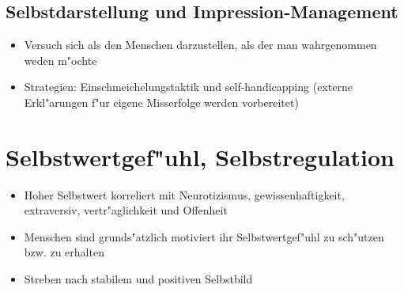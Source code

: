 \subsection{Selbstdarstellung und Impression-Management}
\begin{itemize}
	\item
		Versuch sich als den Menschen darzustellen, als der man wahrgenommen weden m"ochte
	\item
		Strategien: Einschmeichelungstaktik und self-handicapping (externe Erkl"arungen f"ur eigene Misserfolge werden vorbereitet)
\end{itemize}

\section{Selbstwertgef"uhl, Selbstregulation}
\begin{itemize}
	\item
		Hoher Selbstwert korreliert mit Neurotizismus, gewissenhaftigkeit, extraversiv, vertr"aglichkeit und Offenheit
	\item
		Menschen sind grunds"atzlich motiviert ihr Selbstwertgef"uhl zu sch"utzen bzw. zu erhalten
	\item
		Streben nach stabilem und positiven Selbstbild
\end{itemize}

